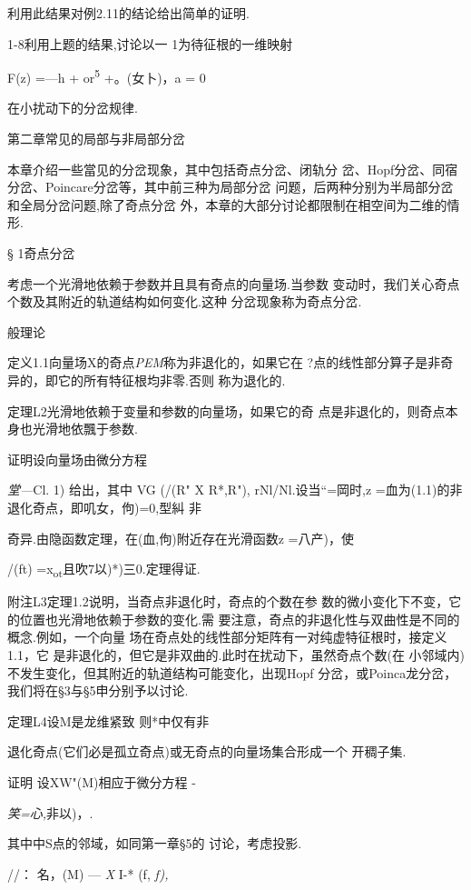 \documentclass{article}
\begin{document}
利用此结果对例2.11的结论给出简单的证明.

1-8利用上题的结果,讨论以一 1为待征根的一维映射

F(z) =---h + or\textsuperscript{5} +。(女卜)，a = 0

在小扰动下的分岔规律.

第二章常见的局部与非局部分岔

本章介绍一些當见的分岔现象，其中包括奇点分岔、闭轨分
岔、Hopf分岔、同宿分岔、Poincare分岔等，其中前三种为局部分岔
问题，后两种分别为半局部分岔和全局分岔问题,除了奇点分岔
外，本章的大部分讨论都限制在相空间为二维的情形.

\protect\hypertarget{bookmark51}{}{}§ 1奇点分岔

考虑一个光滑地依赖于参数并且具有奇点的向量场.当参数
变动时，我们关心奇点个数及其附近的轨道结构如何变化.这种
分岔现象称为奇点分岔.

{ } 般理论

定义1.1向量场X的奇点\emph{PEM}称为非退化的，如果它在
?点的线性部分算子是非奇异的，即它的所有特征根均非零.否则 称为退化的.

定理L2光滑地依赖于变量和参数的向量场，如果它的奇
点是非退化的，则奇点本身也光滑地依飄于参数.

证明设向量场由微分方程

\emph{堂---}Cl. 1) 给出，其中 VG (/(R" X R*,R"), rNl/Nl.设当``=岡时,z
=血为(1.1)的非退化奇点，即叽女，佝)=0,型糾 非

奇异.由隐函数定理，在(血,佝)附近存在光滑函数z =八产)，使

/(ft) =x\textsubscript{ot}且吹7以)*)三0.定理得证.\textbar{}

附注L3定理1.2说明，当奇点非退化时，奇点的个数在参
数的微小变化下不变，它的位置也光滑地依赖于参数的变化.需
要注意，奇点的非退化性与双曲性是不同的概念.例如，一个向量
场在奇点处的线性部分矩阵有一对纯虚特征根时，接定义1.1，它
是非退化的，但它是非双曲的.此时在扰动下，虽然奇点个数(在
小邻域内)不发生变化，但其附近的轨道结构可能变化，出现Hopf
分岔，或Poinca龙分岔，我们将在§3与§5申分别予以讨论.

定理L4设M是龙维紧致 则*中仅有非

退化奇点(它们必是孤立奇点)或无奇点的向量场集合形成一个 开稠子集.

证明 设XW"(M)相应于微分方程 -

\emph{笑=心,}非以)，.

其中中S点的邻域，如同第一章§5的 讨论，考虑投影.

//： 名，(M) --- \emph{X} I-* (f, \emph{f),}
\end{document}
